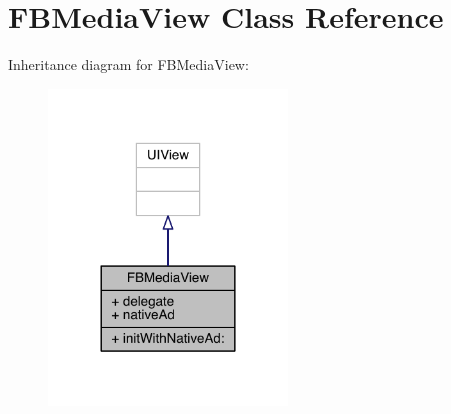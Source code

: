 \hypertarget{interface_f_b_media_view}{\section{F\-B\-Media\-View Class Reference}
\label{interface_f_b_media_view}
}


Inheritance diagram for F\-B\-Media\-View\-:
\nopagebreak
\begin{figure}[H]
\begin{center}
\leavevmode
\includegraphics[width=180pt]{interface_f_b_media_view__inherit__graph}
\end{center}
\end{figure}


